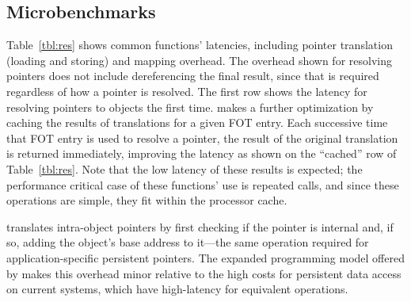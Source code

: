 {    \subsection{Microbenchmarks}

    Table~\ref{tbl:res} shows common \Twizzler functions' latencies, including pointer
    translation (loading and storing) and mapping overhead.
    The overhead shown for resolving pointers does not
    include dereferencing the final result, since that is required regardless of how a pointer is
    resolved. The first row shows the latency for resolving pointers to objects the first time.
    \Twizzler makes a further optimization by
    caching the results of translations for a given FOT entry. Each successive
    time that FOT entry is used to resolve a pointer, the result of the original translation is returned
    immediately, improving the latency as shown on the ``cached'' row of Table~\ref{tbl:res}. Note that
    the low latency of these results is expected; the performance critical case of these functions' use
    is repeated calls, and since these operations are simple, they fit within the processor cache.

    \Twizzler translates intra-object pointers by first
    checking if the pointer is internal and, if so, adding the object's base
    address to it---the same operation required for application-specific
    persistent pointers. The expanded programming model offered by \Twizzler
    makes this overhead minor relative to the high costs for persistent data access on
    current systems, which have high-latency for equivalent operations.

}
